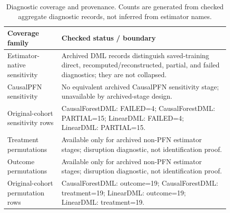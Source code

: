 \begin{table}[H] \centering \small
\caption{Diagnostic coverage and provenance. Counts are generated from checked aggregate diagnostic records, not inferred from estimator names.}\label{tab:supp-diagnostic-coverage}
\begin{tabular}{p{0.22\linewidth}p{0.68\linewidth}} \toprule Coverage family & Checked status / boundary\\ \midrule
Estimator-native sensitivity & Archived DML records distinguish saved-training direct, recomputed/reconstructed, partial, and failed diagnostics; they are not collapsed.\\
CausalPFN sensitivity & No equivalent archived CausalPFN sensitivity stage; unavailable by archived-stage design.\\
Original-cohort sensitivity rows & CausalForestDML: FAILED=4; CausalForestDML: PARTIAL=15; LinearDML: FAILED=4; LinearDML: PARTIAL=15.\\
Treatment permutations & Available only for archived non-PFN estimator stages; disruption diagnostic, not identification proof.\\
Outcome permutations & Available only for archived non-PFN estimator stages; disruption diagnostic, not identification proof.\\
Original-cohort permutation rows & CausalForestDML: outcome=19; CausalForestDML: treatment=19; LinearDML: outcome=19; LinearDML: treatment=19.\\
\bottomrule \end{tabular}
\end{table}
